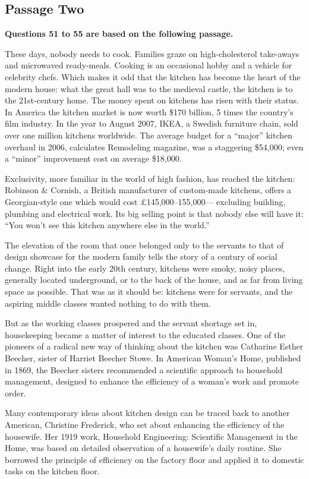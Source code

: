 \documentclass[UTF8,11pt]{ctexart}
\begin{document}
\subsection*{\textbf{Passage Two}}


\textbf{Questions 51 to 55 are based on the following passage.}


These days, nobody needs to cook. Families graze on high-cholesterol take-aways and microwaved ready-meals. Cooking is an occasional hobby and a vehicle for celebrity chefs. Which makes it odd that the kitchen has become the heart of the modern house: what the great hall was to the medieval castle, the kitchen is to the 21st-century home. The money spent on kitchens has risen with their status. In America the kitchen market is now worth \$170 billion, 5 times the country’s film industry. In the year to August 2007, IKEA, a Swedish furniture chain, sold over one million kitchens worldwide. The average budget for a “major” kitchen overhaul in 2006, calculates Remodeling magazine, was a staggering \$54,000; even a “minor” improvement cost on average \$18,000.


Exclusivity, more familiar in the world of high fashion, has reached the kitchen: Robinson \& Cornish, a British manufacturer of custom-made kitchens, offers a Georgian-style one which would cost £145,000–155,000— excluding building, plumbing and electrical work. Its big selling point is that nobody else will have it: “You won’t see this kitchen anywhere else in the world.”


The elevation of the room that once belonged only to the servants to that of design showcase for the modern family tells the story of a century of social change. Right into the early 20th century, kitchens were smoky, noisy places, generally located underground, or to the back of the house, and as far from living space as possible. That was as it should be: kitchens were for servants, and the aspiring middle classes wanted nothing to do with them.


But as the working classes prospered and the servant shortage set in, housekeeping became a matter of interest to the educated classes. One of the pioneers of a radical new way of thinking about the kitchen was Catharine Esther Beecher, sister of Harriet Beecher Stowe. In American Woman’s Home, published in 1869, the Beecher sisters recommended a scientific approach to household management, designed to enhance the efficiency of a woman’s work and promote order.


Many contemporary ideas about kitchen design can be traced back to another American, Christine Frederick, who set about enhancing the efficiency of the housewife. Her 1919 work, Household Engineering: Scientific Management in the Home, was based on detailed observation of a housewife’s daily routine. She borrowed the principle of efficiency on the factory floor and applied it to domestic tasks on the kitchen floor.
\end{document}
